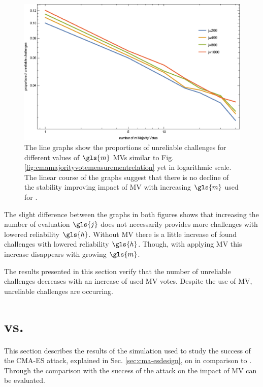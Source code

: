 \begin{figure}[ht]
\includegraphics[width=1.00\textwidth]{images/mv-measurements-unstableChallenges_loglog.eps}
\caption[Proportion of unreliable challenges logarithmic]{The line graphs show the proportions of unreliable challenges for different values of $\gls{m}$ \acp{MV} similar to Fig. \ref{fig:cmamajorityvotemeasurementrelation} yet in logarithmic scale. The linear course of the graphs suggest that there is no decline of the stability improving impact of \ac{MV} with increasing $\gls{m}$ used for \mpufs.}
\label{fig:cmamajorityvotemeasurementrelationloglog}
\end{figure}

The slight difference between the graphs in both figures shows that increasing the number of evaluation $\gls{j}$ does not necessarily provides more challenges with lowered reliability $\gls{h}$.
Without \ac{MV} there is a little increase of found challenges with lowered reliability $\gls{h}$.
Though, with applying \ac{MV} this increase disappears with growing $\gls{m}$.

The results presented in this section verify that the number of unreliable challenges decreases with an increase of used \ac{MV} votes.
Despite the use of \ac{MV}, unreliable challenges are occurring.


\section{\apufs vs. \mpufs}
\label{sec:arbitervsmajorityarbiter}

This section describes the results of the simulation used to study the success of the \ac{CMA-ES} attack, explained in Sec. \ref{sec:cma-esdesign}, on \mpufs in comparison to \apufs.
Through the comparison with the success of the attack on \apuf the impact of \ac{MV} can be evaluated.

